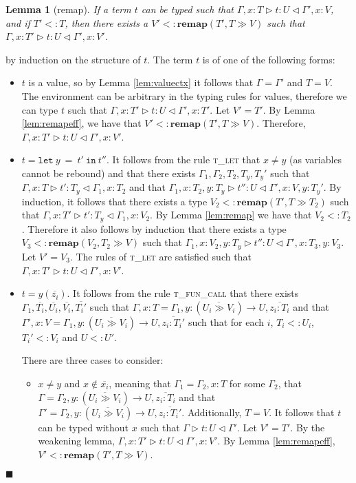 \documentclass{article}
\newtheorem{lem}{Lemma}
\newcommand{\lemref}[1]{Lemma \ref{#1}}
\newcommand{\tlet}{\textsc{t\_let} }
\newcommand{\tfunc}{\textsc{t\_fun\_call} }
\newcommand{\remapapp}[3]{\ensuremath{\mathbf{remap}(#1, #2 \gg #3)}}
\newcommand{\typerule}[4]{#1 \triangleright #2 : #3 \triangleleft #4}
\newcommand{\funt}[3]{(\overline{#1 \gg #2}) \rightarrow #3}
\newcommand{\lett}[3]{\mathtt{let}\:#1\:\mathtt{=}\:#2\:\mathtt{in}\:#3}
\newcommand{\qed}{$\blacksquare$}
\newenvironment{proof}{\vspace{1ex}\noindent{\bf Proof}\hspace{0.5em}}
  {\hfill\qed\vspace{1ex}}
\begin{document}
\begin{lem}[remap]
\label{lem:upgrade}
If a term $t$ can be typed such that 
$\typerule{\Gamma, x : T}{t}{U}{\Gamma', x : V}$, and if
$T' <: T$, then there exists a $V' <: \remapapp{T'}{T}{V}$ 
such that $\typerule{\Gamma, x : T'}{t}{U}{\Gamma', x : V'}$.
\end{lem}
\begin{proof}
by induction on the structure of $t$.
The term $t$ is of one of the following forms:

\begin{itemize}
\item $t$ is a value, so by \lemref{lem:valuectx} it follows that
$\Gamma = \Gamma'$ and $T = V$. 
The environment can be arbitrary in the typing rules for values,
therefore we can type $t$ such that 
$\typerule{\Gamma, x : T'}{t}{U}{\Gamma', x : T'}$.
Let $V' = T'$.
By \lemref{lem:remapeff}, we have that $V' <: \remapapp{T'}{T}{V}$.
Therefore, $\typerule{\Gamma, x : T'}{t}{U}{\Gamma', x : V'}$.

\item $t = \lett{y}{t'}{t''}$. It follows from the rule \tlet that
$x \neq y$ (as variables cannot be rebound) and that there exists 
$\Gamma_1, \Gamma_2, T_2, T_y, T_y'$ such that
$\typerule{\Gamma, x : T}{t'}{T_y}{\Gamma_1, x : T_2}$ and that
$\typerule{\Gamma_1, x : T_2, y : T_y}{t''}{U}{\Gamma', x : V, y : T_y'}$.
By induction, it follows that there exists a type $V_2 <: \remapapp{T'}{T}{T_2}$ such that
$\typerule{\Gamma, x : T'}{t'}{T_y}{\Gamma_1, x : V_2}$.
By \lemref{lem:remap} we have that $V_2 <: T_2$.
Therefore it also follows by induction that
there exists a type $V_3 <: \remapapp{V_2}{T_2}{V}$
such that
$\typerule{\Gamma_1, x : V_2, y : T_y}{t''}{U}{\Gamma', x : T_3, y : V_3}$.
Let $V' = V_3$. The rules of \tlet are satisfied such that
$\typerule{\Gamma, x : T'}{t}{U}{\Gamma', x : V'}$.

\item $t = y ( \overline{z_i} )$. 
It follows from the rule \tfunc that there exists
$\Gamma_1, \overline{T_i}, \overline{U_i}, \overline{V_i}, \overline{T_i'}$ 
such that 
$\Gamma, x : T = \Gamma_1, y : \funt{U_i}{V_i}{U}, \overline{z_i : T_i}$
and that
$\Gamma', x : V = \Gamma_1, y : \funt{U_i}{V_i}{U}, \overline{z_i : T_i'}$
such that for each $i$, $T_i <: U_i$, $T_i' <: V_i$ 
and $U <: U'$.

There are three cases to consider:
\begin{itemize}
\item $x \neq y$ and $x \notin \overline{x_i}$, meaning that
$\Gamma_1 = \Gamma_2, x : T$ for some $\Gamma_2$, that
$\Gamma = \Gamma_2, y : \funt{U_i}{V_i}{U}, \overline{z_i : T_i}$
and that $\Gamma' = \Gamma_2, y : \funt{U_i}{V_i}{U}, \overline{z_i : T_i'}$.
Additionally, $T = V$. 
It follows that $t$ can be typed without $x$
such that $\typerule{\Gamma}{t}{U}{\Gamma'}$. Let $V' = T'$.
By the weakening lemma, $\typerule{\Gamma, x : T'}{t}{U}{\Gamma', x : V'}$.
By \lemref{lem:remapeff}, $V' <: \remapapp{T'}{T}{V}$.


\end{itemize}
\end{itemize}
\end{proof}
\end{document}
